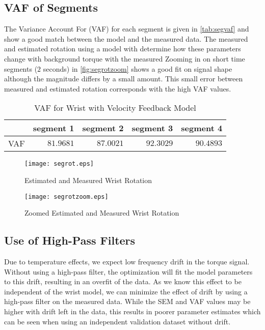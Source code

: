 \documentclass[11pt,a4paper]{article}
\begin{document}
\subsection{VAF of Segments}
The Variance Account For (VAF) for each segment is given in
\autoref{tab:segvaf} and show a good match between the model and the measured
data. The measured and estimated rotation using a model with determine how
these parameters change with background torque with the measured Zooming in on
short time segments ($2$ seconds) in \autoref{fig:segrotzoom} shows a good fit
on signal shape although the magnitude differs by a small amount. This small
error between measured and estimated rotation corresponds with the high VAF
values.
\begin{table}
    \centering
    \begin{tabular}{|l|r|r|r|r|}
        \hline
        \nonumber & segment 1 & segment 2 & segment 3 & segment 4 \\
        \hline
        VAF & $81.9681$ & $87.0021$ & $92.3029$ & $90.4893$ \\
        \hline
    \end{tabular}
    \caption{VAF for Wrist with Velocity Feedback Model}
    \label{tab:segvaf}
\end{table}

\begin{figure}
    \centering
    \texttt{[image: segrot.eps]}
    \caption{Estimated and Measured Wrist Rotation}
    \label{fig:segrot}
\end{figure}

\begin{figure}
    \centering
    \texttt{[image: segrotzoom.eps]}
    \caption{Zoomed Estimated and Measured Wrist Rotation}
    \label{fig:segrotzoom}
\end{figure}

\subsection{Use of High-Pass Filters}
Due to temperature effects, we expect low frequency drift in the torque signal.
Without using a high-pass filter, the optimization will fit the model
parameters to this drift, resulting in an overfit of the data. As we know this
effect to be independent of the wrist model, we can minimize the effect of
drift by using a high-pass filter on the measured data. While the SEM and VAF
values may be higher with drift left in the data, this results in poorer
parameter estimates which can be seen when using an independent validation
dataset without drift.
\end{document}
